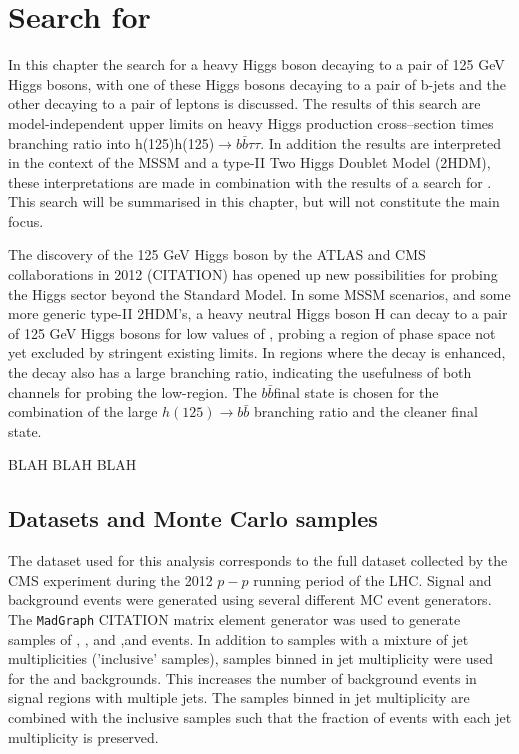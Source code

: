 \chapter{\texorpdfstring{Search for \Htohhtobbtautau}{Search for H -> hh -> bbtautau}}
\label{sec:hhh}

In this chapter the search for a heavy Higgs boson decaying to a pair of 125 GeV Higgs bosons, with one of these Higgs bosons decaying to 
a pair of b-jets and the other decaying to a pair of \Ptau leptons is discussed. The results of this search are model-independent
upper limits on heavy Higgs production cross--section times branching ratio into h(125)h(125)$\rightarrow b\bar{b} \tau\tau$. In addition 
the results are interpreted in the context of the MSSM and a type-II Two Higgs Doublet Model (2HDM), these interpretations are made
in combination with the results of a search for \AtoZhtolltautau. This search will be summarised in this
chapter, but will not constitute the main focus.

The discovery of the 125 GeV Higgs boson by the ATLAS and CMS collaborations in 2012 (CITATION) has opened up
new possibilities for probing the Higgs sector beyond the Standard Model. In some MSSM scenarios, and some more
generic type-II 2HDM's, a heavy neutral Higgs boson H can decay to a pair of 125 GeV Higgs bosons for low values
of \tanb, probing a region of phase space not yet excluded by stringent existing limits. In regions where
the decay \Htohh is enhanced, the \AtoZh decay also has a large branching ratio, indicating the usefulness
of both channels for probing the low-\tanb region. The $b\bar{b}$\tautau final state is chosen for the combination
of the large $h(125) \rightarrow b\bar{b}$ branching ratio and the cleaner \htotautau final state.

BLAH BLAH BLAH

\section{Datasets and Monte Carlo samples}
\label{sec:hhh_datasets}
The dataset used for this analysis corresponds to the full dataset collected by the CMS experiment during the 2012 $p-p$ 
running period of the LHC. 
Signal and background events were generated using several different MC event generators. The \texttt{MadGraph}
CITATION matrix element generator was used to generate samples of \Wjets, \Zellell, \ttbar and \ZZ ,\WZ and \WW
events. In addition to samples with a mixture of jet multiplicities ('inclusive' samples), samples binned in jet multiplicity
were used for the \Wjets and \Zellell backgrounds. This increases the number of background events
in signal regions with multiple jets. The samples binned in jet multiplicity are combined with the
inclusive samples such that the fraction of events with each jet multiplicity is preserved.

